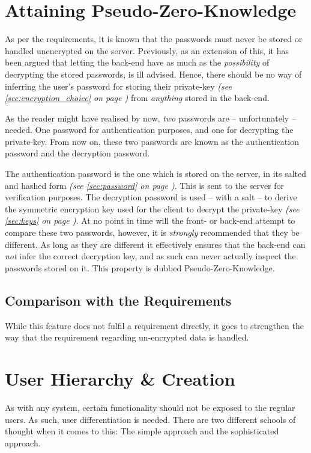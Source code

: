 	\section{Attaining Pseudo-Zero-Knowledge}
		\label{sec:design:pseudo-zero-knowledge}
		As per the requirements, it is known that the passwords must never be stored or handled unencrypted on the server. Previously, as an extension of this, it has been argued that letting the back-end have as much as the \emph{possibility} of decrypting the stored passwords, is ill advised. Hence, there should be no way of inferring the user's password for storing their private-key \emph{(see \ref{sec:encryption_choice} on page \pageref{sec:encryption_choice})} from \emph{anything} stored in the back-end.

		As the reader might have realised by now, \emph{two} passwords are -- unfortunately -- needed. One password for authentication purposes, and one for decrypting the private-key. From now on, these two passwords are known as the authentication password and the decryption password.
 
		The authentication password is the one which is stored on the server, in its salted and hashed form \emph{(see \ref{sec:password} on page \pageref{sec:password})}. This is sent to the server for verification purposes. The decryption password is used -- with a salt -- to derive the symmetric encryption key used for the client to decrypt the private-key \emph{(see \ref{sec:keys} on page \pageref{sec:keys})}. At no point in time will the front- or back-end attempt to compare these two passwords, however, it is \emph{strongly} recommended that they be different. As long as they are different it effectively ensures that the back-end can \emph{not} infer the correct decryption key, and as such can never actually inspect the passwords stored on it. This property is dubbed Pseudo-Zero-Knowledge.

		\subsection{Comparison with the Requirements}
			While this feature does not fulfil a requirement directly, it goes to strengthen the way that the requirement regarding un-encrypted data is handled.

	\section{User Hierarchy \& Creation}
		\label{sec:user:diff}
		As with any system, certain functionality should not be exposed to the regular users. As such, user differentiation is needed. There are two different schools of thought when it comes to this: The simple approach and the sophisticated approach.

